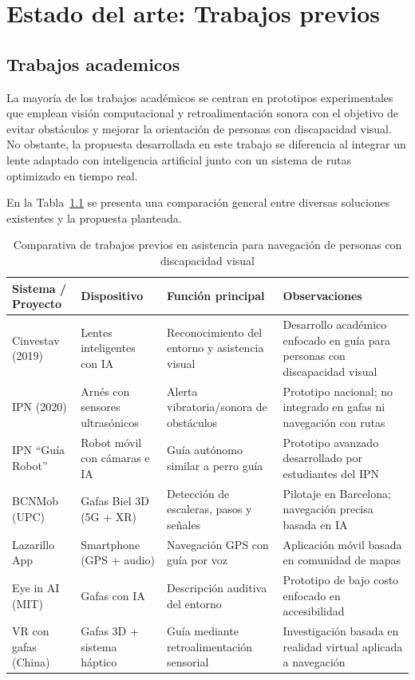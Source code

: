 \chapter{Estado del arte: Trabajos previos}
\section{Trabajos academicos}
La mayoría de los trabajos académicos se centran en prototipos experimentales que emplean visión computacional y retroalimentación sonora con el objetivo de evitar obstáculos y mejorar la orientación de personas con discapacidad visual. No obstante, la propuesta desarrollada en este trabajo se diferencia al integrar un lente adaptado con inteligencia artificial junto con un sistema de rutas optimizado en tiempo real.

En la Tabla~\ref{tab:estado_arte} se presenta una comparación general entre diversas soluciones existentes y la propuesta planteada.

\begin{table}[H]
\centering
\caption{Comparativa de trabajos previos en asistencia para navegación de personas con discapacidad visual}
\label{tab:estado_arte}
\begin{tabular}{|p{3cm}|p{3cm}|p{4cm}|p{4cm}|}
\hline
\textbf{Sistema / Proyecto} & \textbf{Dispositivo} & \textbf{Función principal} & \textbf{Observaciones} \\
\hline
Cinvestav (2019) \cite{cinestavlentes} & Lentes inteligentes con IA & Reconocimiento del entorno y asistencia visual & Desarrollo académico enfocado en guía para personas con discapacidad visual \\
\hline
IPN (2020) \cite{IPN_invidentes} & Arnés con sensores ultrasónicos & Alerta vibratoria/sonora de obstáculos & Prototipo nacional; no integrado en gafas ni navegación con rutas \\
\hline
IPN “Guía Robot” \cite{AhorraSeguros2025_guia} & Robot móvil con cámaras e IA & Guía autónomo similar a perro guía & Prototipo avanzado desarrollado por estudiantes del IPN \\
\hline
BCNMob (UPC) \cite{CIT2024_gafas} & Gafas Biel 3D (5G + XR) & Detección de escaleras, pasos y señales & Pilotaje en Barcelona; navegación precisa basada en IA \\
\hline
Lazarillo App \cite{Lazarillo2023_app} & Smartphone (GPS + audio) & Navegación GPS con guía por voz & Aplicación móvil basada en comunidad de mapas \\
\hline
Eye in AI (MIT) \cite{eyeAI2023} & Gafas con IA & Descripción auditiva del entorno & Prototipo de bajo costo enfocado en accesibilidad \\
\hline
VR con gafas (China) \cite{Bordonaba2025_navegador} & Gafas 3D + sistema háptico & Guía mediante retroalimentación sensorial & Investigación basada en realidad virtual aplicada a navegación \\
\hline
\end{tabular}
\end{table}

